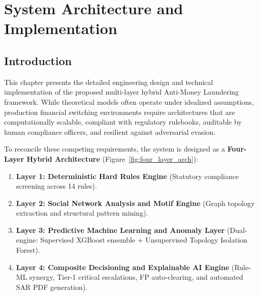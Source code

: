 \chapter{System Architecture and Implementation} \label{ch:architecture}

\section{Introduction}
This chapter presents the detailed engineering design and technical implementation of the proposed multi-layer hybrid Anti-Money Laundering framework. While theoretical models often operate under idealized assumptions, production financial switching environments require architectures that are computationally scalable, compliant with regulatory rulebooks, auditable by human compliance officers, and resilient against adversarial evasion.

To reconcile these competing requirements, the system is designed as a \textbf{Four-Layer Hybrid Architecture} (Figure~\ref{fig:four_layer_arch}):
\begin{enumerate}
    \item \textbf{Layer 1: Deterministic Hard Rules Engine} (Statutory compliance screening across 14 rules).
    \item \textbf{Layer 2: Social Network Analysis and Motif Engine} (Graph topology extraction and structural pattern mining).
    \item \textbf{Layer 3: Predictive Machine Learning and Anomaly Layer} (Dual-engine: Supervised XGBoost ensemble + Unsupervised Topology Isolation Forest).
    \item \textbf{Layer 4: Composite Decisioning and Explainable AI Engine} (Rule-ML synergy, Tier-1 critical escalations, FP auto-clearing, and automated SAR PDF generation).
\end{enumerate}

